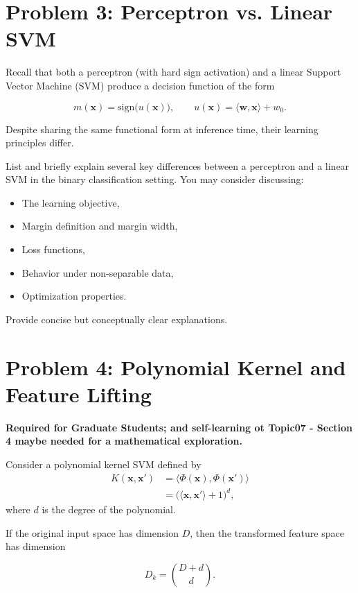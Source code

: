 \documentclass[12pt]{article}
\begin{document}
\section*{Problem 3: Perceptron vs. Linear SVM}

Recall that both a perceptron (with hard sign activation) and a linear Support Vector Machine (SVM) produce a decision function of the form

\[
  m(\bm{x}) = \mathrm{sign}\bigl(u(\bm{x})\bigr),
  \qquad
  u(\bm{x}) = \langle \bm{w}, \bm{x} \rangle + w_0.
\]

Despite sharing the same functional form at inference time, their learning principles differ.

List and briefly explain several key differences between a perceptron and a linear SVM in the binary classification setting.
You may consider discussing:

\begin{itemize}
  \item The learning objective,
  \item Margin definition and margin width,
  \item Loss functions,
  \item Behavior under non-separable data,
  \item Optimization properties.
\end{itemize}

Provide concise but conceptually clear explanations.

\newpage
\section*{Problem 4: Polynomial Kernel and Feature Lifting}

\textbf{Required for Graduate Students; and self-learning ot Topic07 - Section 4 maybe needed for a mathematical exploration.}

Consider a polynomial kernel SVM defined by
\begin{align*}
  K(\bm{x}, \bm{x}')
  &= \langle \Phi(\bm{x}), \Phi(\bm{x}') \rangle \\
  &= \bigl(\langle \bm{x}, \bm{x}' \rangle + 1 \bigr)^d,
\end{align*}
where \( d \) is the degree of the polynomial.

If the original input space has dimension \( D \), then the transformed feature space has dimension

\[
  D_k = \binom{D + d}{d}.
\]
\end{document}
